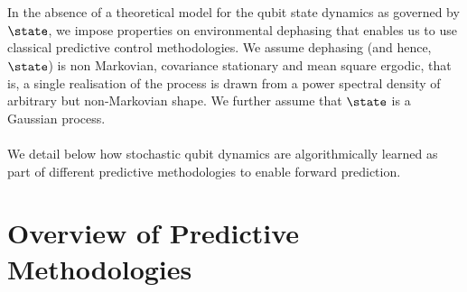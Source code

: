 \\
\\
In the absence of a theoretical model for the qubit state dynamics as governed by $\state$, we impose properties on environmental dephasing that enables us to use classical predictive control methodologies. We assume dephasing (and hence, $\state$) is non Markovian, covariance stationary and mean square ergodic, that is, a single realisation of the process is drawn from a power spectral density of arbitrary but non-Markovian shape. We further assume that $\state$  is a Gaussian process.
\\
\\
We detail below how stochastic qubit dynamics are algorithmically learned as part of different predictive methodologies to enable forward prediction. 


\section{Overview of Predictive Methodologies \label{sec:main:OverviewofPredictive Methodologies}}

